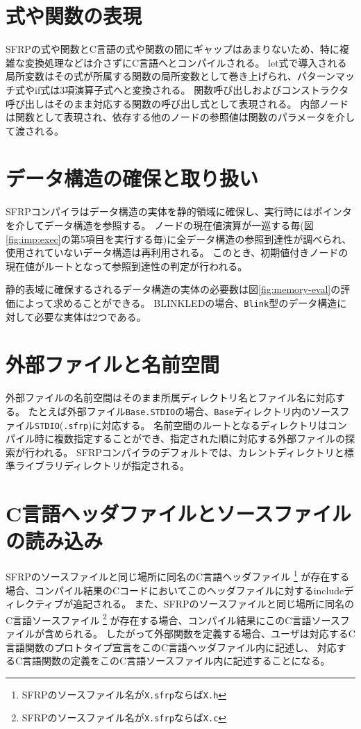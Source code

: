 \section{式や関数の表現}\label{sec:implementation:expression}
SFRPの式や関数とC言語の式や関数の間にギャップはあまりないため、特に複雑な変換処理などは介さずにC言語へとコンパイルされる。
let式で導入される局所変数はその式が所属する関数の局所変数として巻き上げられ、パターンマッチ式やif式は3項演算子式へと変換される。
関数呼び出しおよびコンストラクタ呼び出しはそのまま対応する関数の呼び出し式として表現される。
内部ノードは関数として表現され、依存する他のノードの参照値は関数のパラメータを介して渡される。

\section{データ構造の確保と取り扱い}\label{sec:implementation:data}
SFRPコンパイラはデータ構造の実体を静的領域に確保し、実行時にはポインタを介してデータ構造を参照する。
ノードの現在値演算が一巡する毎(図\ref{fig:imp:exec}の第5項目を実行する毎)に全データ構造の参照到達性が調べられ、使用されていないデータ構造は再利用される。
このとき、初期値付きノードの現在値がルートとなって参照到達性の判定が行われる。

静的表域に確保するされるデータ構造の実体の必要数は図\ref{fig:memory-eval}の評価によって求めることができる。
BLINKLEDの場合、\texttt{Blink}型のデータ構造に対して必要な実体は2つである。

\section{外部ファイルと名前空間}
外部ファイルの名前空間はそのまま所属ディレクトリ名とファイル名に対応する。
たとえば外部ファイル\texttt{Base.STDIO}の場合、\texttt{Base}ディレクトリ内のソースファイル\texttt{STDIO}(\texttt{.sfrp})に対応する。
名前空間のルートとなるディレクトリはコンパイル時に複数指定することができ、指定された順に対応する外部ファイルの探索が行われる。
SFRPコンパイラのデフォルトでは、カレントディレクトリと標準ライブラリディレクトリが指定される。

\section{C言語ヘッダファイルとソースファイルの読み込み}
SFRPのソースファイルと同じ場所に同名のC言語ヘッダファイル
\footnote{SFRPのソースファイル名が\texttt{X.sfrp}ならば\texttt{X.h}}
が存在する場合、コンパイル結果のCコードにおいてこのヘッダファイルに対するincludeディレクティブが追記される。
また、SFRPのソースファイルと同じ場所に同名のC言語ソースファイル
\footnote{SFRPのソースファイル名が\texttt{X.sfrp}ならば\texttt{X.c}}
が存在する場合、コンパイル結果にこのC言語ソースファイルが含められる。
したがって外部関数を定義する場合、ユーザは対応するC言語関数のプロトタイプ宣言をこのC言語ヘッダファイル内に記述し、
対応するC言語関数の定義をこのC言語ソースファイル内に記述することになる。

